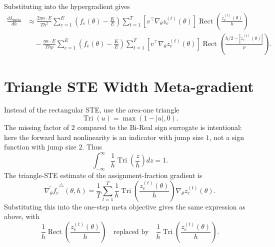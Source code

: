 \documentclass[11pt]{article}
\newcommand{\totalexperts}{E}
\newcommand{\activeexperts}{K}
\newcommand{\batchsize}{T}
\newcommand{\assignmentfraction}{f}
\newcommand{\modelparams}{\theta}
\newcommand{\lbcoef}{\alpha}
\newcommand{\bandwidth}{h}
\newcommand{\rect}{\operatorname{Rect}}
\newcommand{\tri}{\operatorname{Tri}}
\newcommand{\abs}[1]{\left\vert#1\right\vert}
\begin{document}
Substituting into the hypergradient gives
\[
\begin{aligned}
  \frac{dL_{\mathrm{meta}}}{d\bandwidth}
  &\approx
  \frac{2\eta\lbcoef \cdot \totalexperts}
       {\batchsize\bandwidth^2}
  \sum_{e=1}^{\totalexperts}
  \left(
    \assignmentfraction_e(\modelparams)
    -
    \frac{\activeexperts}{\totalexperts}
  \right)
  \sum_{t=1}^{\batchsize}
  \left[
    v^\top
    \nabla_{\modelparams}z_e^{(t)}(\modelparams)
  \right]
  \rect\!\left(
    \frac{z_e^{(t)}(\modelparams)}{\bandwidth}
  \right) \\
  &\quad
  -
  \frac{\eta\lbcoef \cdot \totalexperts}
       {\batchsize\bandwidth\rho}
  \sum_{e=1}^{\totalexperts}
  \left(
    \assignmentfraction_e(\modelparams)
    -
    \frac{\activeexperts}{\totalexperts}
  \right)
  \sum_{t=1}^{\batchsize}
  \left[
    v^\top
    \nabla_{\modelparams}z_e^{(t)}(\modelparams)
  \right]
  \rect\!\left(
    \frac{\bandwidth/2-\abs{z_e^{(t)}(\modelparams)}}{\rho}
  \right).
\end{aligned}
\]

\section{Triangle STE Width Meta-gradient}

Instead of the rectangular STE, use the area-one triangle
\[
  \tri(u)=\max(1-\abs{u},0).
\]
The missing factor of $2$ compared to the Bi-Real sign surrogate is
intentional: here the forward hard nonlinearity is an indicator with jump size
$1$, not a sign function with jump size $2$.  Thus
\[
  \int_{-\infty}^{\infty}
  \frac{1}{\bandwidth}
  \tri\!\left(\frac{z}{\bandwidth}\right)
  dz
  =
  1.
\]
The triangle-STE estimate of the assignment-fraction gradient is
\[
  \widetilde{\nabla_{\modelparams}\assignmentfraction_e}^{\triangle}
  (\modelparams,\bandwidth)
  =
  \frac{1}{\batchsize}
  \sum_{t=1}^{\batchsize}
  \frac{1}{\bandwidth}
  \tri\!\left(
    \frac{z_e^{(t)}(\modelparams)}{\bandwidth}
  \right)
  \nabla_{\modelparams} z_e^{(t)}(\modelparams).
\]
Substituting this into the one-step meta objective gives the same expression
as above, with
\[
  \frac{1}{\bandwidth}
  \rect\!\left(\frac{z_e^{(t)}(\modelparams)}{\bandwidth}\right)
  \quad\text{replaced by}\quad
  \frac{1}{\bandwidth}
  \tri\!\left(\frac{z_e^{(t)}(\modelparams)}{\bandwidth}\right).
\]
\end{document}
